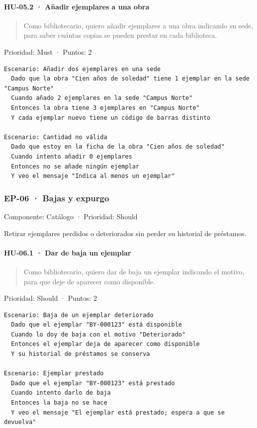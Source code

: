\paragraph*{HU-05.2 · Añadir ejemplares a una obra}

\begin{quote}
Como bibliotecario, quiero añadir ejemplares a una obra indicando su sede, para saber cuántas copias se pueden prestar en cada biblioteca.
\end{quote}

Prioridad: Must · Puntos: 2

\begin{Verbatim}[breaklines,fontsize=\small,frame=single,framerule=0.4pt,rulecolor=\color{black!25}]
Escenario: Añadir dos ejemplares en una sede
  Dado que la obra "Cien años de soledad" tiene 1 ejemplar en la sede "Campus Norte"
  Cuando añado 2 ejemplares en la sede "Campus Norte"
  Entonces la obra tiene 3 ejemplares en "Campus Norte"
  Y cada ejemplar nuevo tiene un código de barras distinto

Escenario: Cantidad no válida
  Dado que estoy en la ficha de la obra "Cien años de soledad"
  Cuando intento añadir 0 ejemplares
  Entonces no se añade ningún ejemplar
  Y veo el mensaje "Indica al menos un ejemplar"
\end{Verbatim}

\subsubsection*{EP-06 · Bajas y expurgo}

Componente: Catálogo · Prioridad: Should

Retirar ejemplares perdidos o deteriorados sin perder su historial de préstamos.

\paragraph*{HU-06.1 · Dar de baja un ejemplar}

\begin{quote}
Como bibliotecario, quiero dar de baja un ejemplar indicando el motivo, para que deje de aparecer como disponible.
\end{quote}

Prioridad: Should · Puntos: 2

\begin{Verbatim}[breaklines,fontsize=\small,frame=single,framerule=0.4pt,rulecolor=\color{black!25}]
Escenario: Baja de un ejemplar deteriorado
  Dado que el ejemplar "BY-000123" está disponible
  Cuando lo doy de baja con el motivo "Deteriorado"
  Entonces el ejemplar deja de aparecer como disponible
  Y su historial de préstamos se conserva

Escenario: Ejemplar prestado
  Dado que el ejemplar "BY-000123" está prestado
  Cuando intento darlo de baja
  Entonces la baja no se hace
  Y veo el mensaje "El ejemplar está prestado; espera a que se devuelva"
\end{Verbatim}

